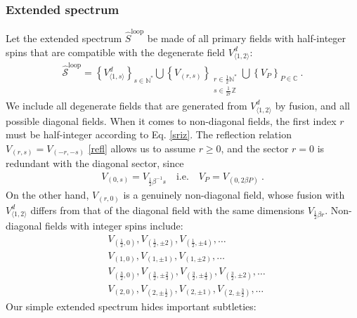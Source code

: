 \documentclass[12pt, a4paper]{article}
\begin{document}
\subsubsection{Extended spectrum}\label{sec:es}

Let the extended spectrum $\widehat{S}^\text{loop}$ be made of all primary fields with half-integer spins that are compatible with the degenerate field $V^d_{\langle 1,2\rangle}$:
\begin{align}
 \boxed{\widehat{\mathcal{S}}^\text{loop} = \left\{V^d_{\langle 1,s\rangle}\right\}_{s\in\mathbb{N}^*}  \bigcup \left\{V_{(r,s)}\right\}_{\substack{r\in \frac12\mathbb{N}^*\\ s\in\frac{1}{2r}\mathbb{Z}}}\bigcup \left\{ V_P\right\}_{P\in\mathbb{C}} } \ .
 \label{sloop}
\end{align}
We include all degenerate fields that are generated from $V^d_{\langle 1,2\rangle}$ by fusion, and all possible diagonal fields. When it comes to non-diagonal fields, the first index $r$ must be half-integer according to Eq. \eqref{sriz}. The reflection relation $V_{(r,s)}=V_{(-r,-s)}$ \eqref{refl} allows us to assume $r\geq 0$, and the sector $r=0$ is redundant with the diagonal sector, since 
\begin{align}
 \boxed{V_{(0,s)} = V_{\frac12\beta^{-1}s}  \quad \text{i.e.} \quad V_P = V_{(0,2\beta P)}} \ .
 \label{sP}
\end{align}
On the other hand, $V_{(r,0)}$ is a genuinely non-diagonal field, whose fusion with $V^d_{\langle 1,2\rangle}$ differs from that of the diagonal field with the same dimensions $V_{\frac12\beta r}$. 
Non-diagonal fields with integer spins include:
\begin{subequations}
\label{vex}
\begin{align}
 & V_{(\frac12, 0)}, V_{(\frac12,\pm 2)}, V_{(\frac12, \pm 4)}, \dots
 \\
 & V_{(1,0)}, V_{(1,\pm 1)}, V_{(1,\pm 2)}, \dots 
 \\
 & V_{(\frac32, 0)}, V_{(\frac32, \pm\frac23)}, V_{(\frac32,\pm \frac43)} , V_{(\frac32,\pm 2)}, \dots 
 \\
 & V_{(2, 0)}, V_{(2,\pm\frac12)}, V_{(2,\pm 1)}, V_{(2,\pm\frac32)}, \dots 
\end{align}
\end{subequations}
Our simple extended spectrum hides important subtleties: 
\end{document}
